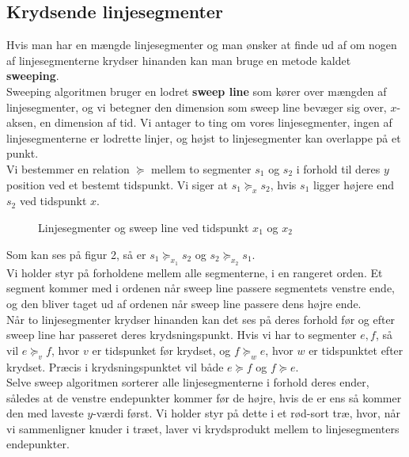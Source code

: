 \subsection{Krydsende linjesegmenter}
Hvis man har en mængde linjesegmenter og man ønsker at finde ud af om nogen af linjesegmenterne krydser hinanden kan man bruge en metode kaldet \textbf{sweeping}.\\
Sweeping algoritmen bruger en lodret \textbf{sweep line} som kører over mængden af linjesegmenter, og vi betegner den dimension som sweep line bevæger sig over, $x$-aksen, en dimension af tid. Vi antager to ting om vores linjesegmenter, ingen af linjesegmenterne er lodrette linjer, og højst to linjesegmenter kan overlappe på et punkt.\\

Vi bestemmer en relation $\succeq$ mellem to segmenter $s_1$ og $s_2$ i forhold til deres $y$ position ved et bestemt tidspunkt. Vi siger at $s_1 \succeq_x s_2$, hvis $s_1$ ligger højere end $s_2$ ved tidspunkt $x$.
\begin{figure}[H]
  \centering
  \caption{Linjesegmenter og sweep line ved tidspunkt $x_1$ og $x_2$}
\end{figure}

Som kan ses på figur 2, så er $s_1 \succeq_{x_1} s_2$ og $s_2 \succeq_{x_2} s_1$.\\
Vi holder styr på forholdene mellem alle segmenterne, i en rangeret orden. Et segment kommer med i ordenen når sweep line passere segmentets venstre ende, og den bliver taget ud af ordenen når sweep line passere dens højre ende.\\

Når to linjesegmenter krydser hinanden kan det ses på deres forhold før og efter sweep line har passeret deres krydsningspunkt. Hvis vi har to segmenter $e, f$, så vil $e \succeq_v f$, hvor $v$ er tidspunket før krydset, og $f \succeq_w e$, hvor $w$ er tidspunktet efter krydset. Præcis i krydsningspunktet vil både $e \succeq f$ og $f \succeq e$.\\

Selve sweep algoritmen sorterer alle linjesegmenterne i forhold deres ender, således at de venstre endepunkter kommer før de højre, hvis de er ens så kommer den med laveste $y$-værdi først. Vi holder styr på dette i et rød-sort træ, hvor, når vi sammenligner knuder i træet, laver vi krydsprodukt mellem to linjesegmenters endepunkter.\\

